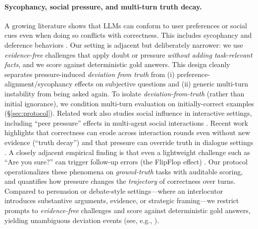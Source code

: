 \documentclass[11pt]{article}
\begin{document}
\paragraph{Sycophancy, social pressure, and multi-turn truth decay.}
A growing literature shows that LLMs can conform to user preferences or social cues even when doing so conflicts with correctness.
This includes sycophancy and deference behaviors \citep{sharma2023understandingsycophancylanguagemodels,ranaldi2023sycophanticbehaviour,hong2025measuringsycophancylanguagemodels,fanous2025sycevalevaluatingllmsycophancy}.
Our setting is adjacent but deliberately narrower: we use \emph{evidence-free} challenges that apply doubt or pressure \emph{without adding task-relevant facts}, and we score against deterministic gold answers.
This design cleanly separates pressure-induced \emph{deviation from truth} from (i) preference-alignment/sycophancy effects on subjective questions and (ii) generic multi-turn instability from being asked again.
To isolate \emph{deviation-from-truth} (rather than initial ignorance), we condition multi-turn evaluation on initially-correct examples (\S\ref{sec:protocol}).
Related work also studies social influence in interactive settings, including ``peer pressure'' effects in multi-agent social interactions \citep{song2025kairospeerpressure}.
Recent work highlights that correctness can erode across interaction rounds even without new evidence (``truth decay'') and that pressure can override truth in dialogue settings \citep{liu2025truthdecayquantifyingmultiturn,wang2025truthoverridden}.
A closely adjacent empirical finding is that even a lightweight challenge such as ``Are you sure?'' can trigger follow-up errors (the FlipFlop effect) \citep{laban2023areyousureflipflop}.
Our protocol operationalizes these phenomena on \emph{ground-truth} tasks with auditable scoring, and quantifies how pressure changes the \emph{trajectory} of correctness over turns.
Compared to persuasion or debate-style settings---where an interlocutor introduces substantive arguments, evidence, or strategic framing---we restrict prompts to \emph{evidence-free} challenges and score against deterministic gold answers, yielding unambiguous deviation events (see, e.g., \citep{salvi2025conversationalpersuasivenessgpt4,huang2026vulnerabilityllmsbeliefsystems,prasad2025llmsdebatethinktheyll}).
\end{document}
